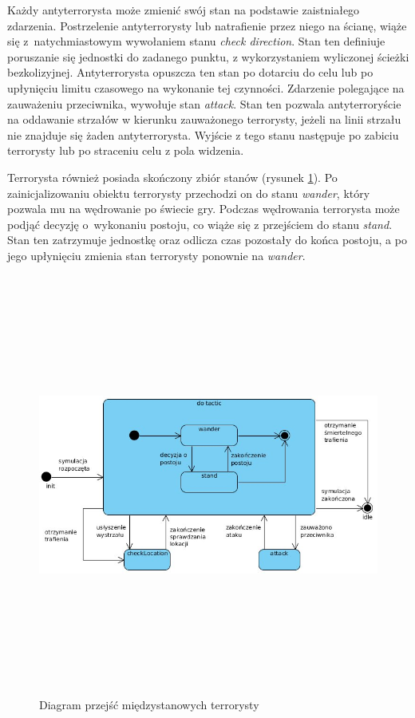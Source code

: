 Każdy antyterrorysta może zmienić swój stan na podstawie zaistniałego zdarzenia. Postrzelenie antyterrorysty lub natrafienie przez niego na ścianę, wiąże się z~natychmiastowym wywołaniem stanu \emph{check direction}. Stan ten definiuje poruszanie się jednostki do zadanego punktu, z wykorzystaniem wyliczonej ścieżki bezkolizyjnej. Antyterrorysta opuszcza ten stan po dotarciu do celu lub po upłynięciu limitu czasowego na wykonanie tej czynności. Zdarzenie polegające na zauważeniu przeciwnika, wywołuje stan \emph{attack}. Stan ten pozwala antyterroryście na oddawanie strzałów w kierunku zauważonego terrorysty, jeżeli na linii strzału nie znajduje się żaden antyterrorysta. Wyjście z tego stanu następuje po zabiciu terrorysty lub po straceniu celu z pola widzenia.

Terrorysta również posiada skończony zbiór stanów (rysunek \ref{terTacticImage}). Po zainicjalizowaniu obiektu terrorysty przechodzi on do stanu \emph{wander}, który pozwala mu na wędrowanie po świecie gry. Podczas wędrowania terrorysta może podjąć decyzję o~wykonaniu postoju, co wiąże się z przejściem do stanu \emph{stand}. Stan ten zatrzymuje jednostkę oraz odlicza czas pozostały do końca postoju, a po jego upłynięciu zmienia stan terrorysty ponownie na \emph{wander}.

\begin{figure}
\begin{center}
	\includegraphics[width=160mm,height=139mm]{images/terTactic}
	\caption{Diagram przejść międzystanowych terrorysty\label{terTacticImage}}
\end{center}
\end{figure}

